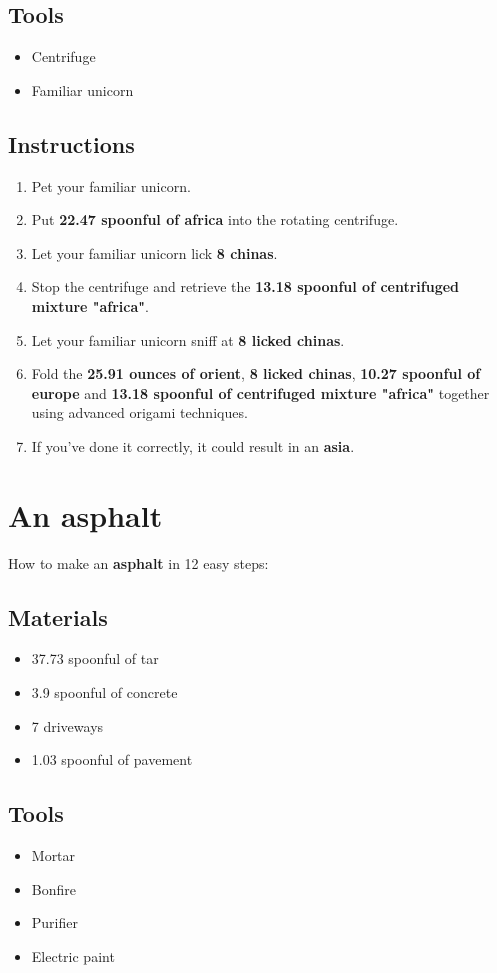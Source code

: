 \documentclass{article}
\begin{document}
\subsection{Tools}\begin{itemize}
\item 
Centrifuge
\item 
Familiar unicorn
\end{itemize}
\subsection{Instructions}\begin{enumerate}
\item 
Pet your familiar unicorn.
\item 
Put \textbf{22.47 spoonful of africa} into the rotating centrifuge.
\item 
Let your familiar unicorn lick \textbf{8 chinas}.
\item 
Stop the centrifuge and retrieve the \textbf{13.18 spoonful of centrifuged mixture "africa"}.
\item 
Let your familiar unicorn sniff at \textbf{8 licked chinas}.
\item 
Fold the \textbf{25.91 ounces of orient}, \textbf{8 licked chinas}, \textbf{10.27 spoonful of europe} and \textbf{13.18 spoonful of centrifuged mixture "africa"} together using advanced origami techniques.
\item 
If you've done it correctly, it could result in an \textbf{asia}.
\end{enumerate}
\newpage
\section{An asphalt}How to make an \textbf{asphalt} in 12 easy steps:

\subsection{Materials}\begin{itemize}
\item 
37.73 spoonful of tar
\item 
3.9 spoonful of concrete
\item 
7 driveways
\item 
1.03 spoonful of pavement
\end{itemize}
\subsection{Tools}\begin{itemize}
\item 
Mortar
\item 
Bonfire
\item 
Purifier
\item 
Electric paint
\end{itemize}
\end{document}
